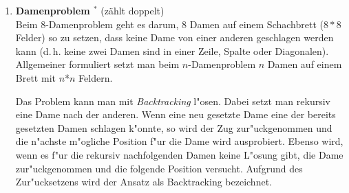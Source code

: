 \begin{enumerate}[1.]






\item \textbf{Damenproblem $^*$} (zählt doppelt)\\
Beim 8-Damenproblem geht es darum, 8 Damen auf einem Schachbrett ($8*8$
Felder) so zu setzen, dass keine Dame von einer anderen geschlagen
werden kann (d.\,h. keine zwei Damen sind in einer Zeile, Spalte oder
Diagonalen). Allgemeiner formuliert setzt man beim
$n$-Damenproblem $n$ Damen auf einem Brett mit $n$*$n$ Feldern.

Das Problem kann man mit \emph{Backtracking} l"osen. Dabei setzt man
rekursiv eine Dame nach der anderen. Wenn eine neu gesetzte Dame
eine der bereits gesetzten Damen schlagen k"onnte, so wird der Zug
zur"uckgenommen und die n"achste m"ogliche Position f"ur die Dame wird
ausprobiert. Ebenso wird, wenn es f"ur die rekursiv nachfolgenden
Damen keine L"osung gibt, die Dame zur"uckgenommen und die folgende
Position versucht. Aufgrund des Zur"ucksetzens wird der Ansatz als
Backtracking bezeichnet.


\end{enumerate}
